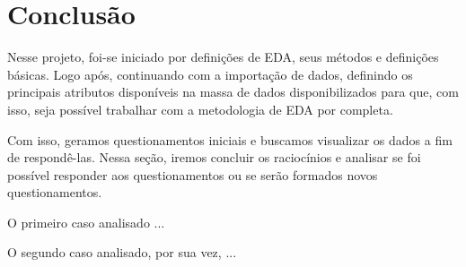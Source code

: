 \chapter{Conclusão}

Nesse projeto, foi-se iniciado por definições de EDA, seus métodos e definições básicas. Logo após, continuando com a importação de dados, definindo os principais atributos disponíveis na massa de dados disponibilizados para que, com isso, seja possível trabalhar com a metodologia de EDA por completa.

Com isso, geramos questionamentos iniciais e buscamos visualizar os dados a fim de respondê-las. Nessa seção, iremos concluir os raciocínios e analisar se foi possível responder aos questionamentos ou se serão formados novos questionamentos.

O primeiro caso analisado ...

O segundo caso analisado, por sua vez, ...

